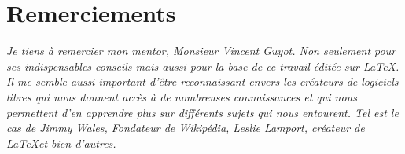 \section*{Remerciements}

\vspace{1cm}

\vspace{1cm}
\textit{Je tiens à remercier mon mentor, Monsieur Vincent Guyot. Non seulement pour ses indispensables conseils mais aussi pour la base de ce travail éditée sur \LaTeX. 
Il me semble aussi important d'être reconnaissant envers les créateurs de logiciels libres qui nous donnent accès à de nombreuses connaissances et qui nous permettent d'en apprendre plus sur différents sujets qui nous entourent. Tel est le cas de Jimmy Wales, Fondateur de Wikipédia, Leslie Lamport, créateur de \LaTeX et bien d'autres.}